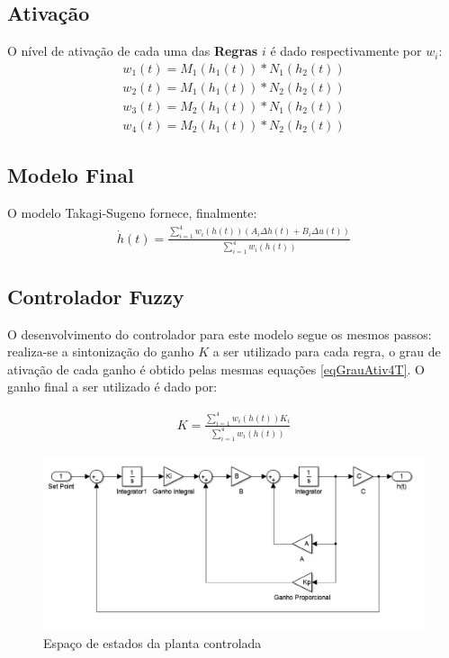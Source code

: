 \subsection{Ativação}
O nível de ativação de cada uma das \textbf{Regras} $i$ é dado respectivamente por $w_i$:
	\begin{equation}
	\begin{aligned}
		w_{1}(t) = M_1(h_1(t)) * N_1(h_2(t)) \\
		w_{2}(t) = M_1(h_1(t)) * N_2(h_2(t)) \\
		w_{3}(t) = M_2(h_1(t)) * N_1(h_2(t)) \\
		w_{4}(t) = M_2(h_1(t)) * N_2(h_2(t))
	\end{aligned}
	\label{eqGrauAtiv4T}
	\end{equation}
	
\subsection{Modelo Final}
O modelo Takagi-Sugeno fornece, finalmente:
	\begin{align}
		\dot{h}(t) = \frac{\sum_{i=1}^{4}  w_i(h(t))(A_i \Delta h(t) +  B_i \Delta u(t))}{\sum_{i=1}^{4} w_i(h(t))}
	\end{align}

\subsection{Controlador Fuzzy}
	O desenvolvimento do controlador para este modelo segue os mesmos passos: realiza-se a sintonização do ganho $K$ a ser utilizado para cada regra, o grau de ativação de cada ganho é obtido pelas mesmas equações \ref{eqGrauAtiv4T}. O ganho final a ser utilizado é dado por:
	
	\begin{align}
		K = \frac{\sum_{i=1}^{4}  w_i(h(t))K_i}{\sum_{i=1}^{4} w_i(h(t))}
	\end{align}
	
	\begin{figure}
		\begin{centering}
			\includegraphics[width=\textwidth]{img/modelo_controlado.png}
			\par\end{centering}
		\caption{\label{figSimPlantCtrl}Espaço de estados da planta controlada}
	\end{figure}

%

